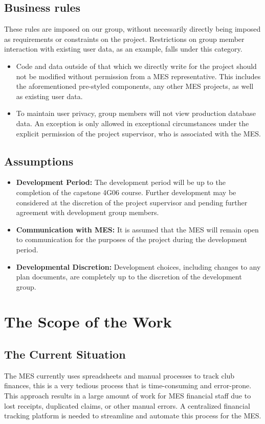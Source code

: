 \documentclass[12pt]{article}
\begin{document}
  \subsection{Business rules}
  These rules are imposed on our group, without necessarily directly being imposed as requirements or constraints on the project. Restrictions on group member interaction with existing user data, as an example, falls under this category.
  \begin{itemize}
    \item Code and data outside of that which we directly write for the project should not be modified without permission from a MES representative. This includes the aforementioned pre-styled components, any other MES projects, as well as existing user data.
    \item To maintain user privacy, group members will not view production database data. An exception is only allowed in exceptional circumstances under the explicit permission of the project supervisor, who is associated with the MES.
  \end{itemize}
  \subsection{Assumptions}
  \begin{itemize}
    \item \textbf{Development Period:} The development period will be up to the completion of the capstone 4G06 course. Further development may be considered at the discretion of the project supervisor and pending further agreement with development group members.
    \item \textbf{Communication with MES:} It is assumed that the MES will remain open to communication for the purposes of the project during the development period.
    \item \textbf{Developmental Discretion:} Development choices, including changes to any plan documents, are completely up to the discretion of the development group.
  \end{itemize}

\section{The Scope of the Work}
  \subsection{The Current Situation}
    The MES currently uses spreadsheets and manual processes to track club finances, this is a very tedious process that is time-consuming and error-prone. 
    This approach results in a large amount of work for MES financial staff due to lost receipts, duplicated claims, or other manual errors. A centralized
    financial tracking platform is needed to streamline and automate this process for the MES.
\end{document}
